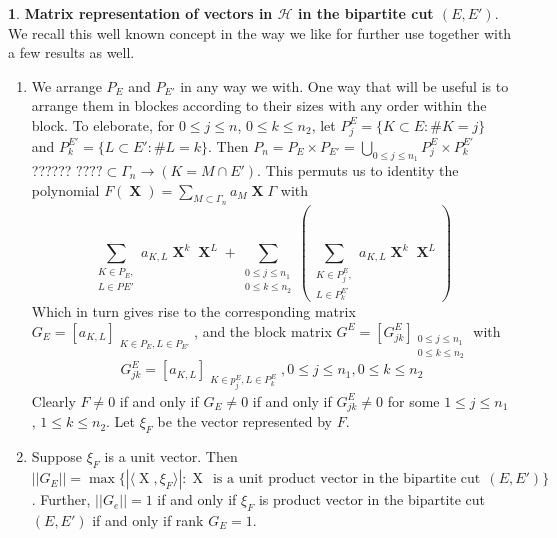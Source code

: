 \documentclass[a4paper,12pt]{article}
\DeclareMathOperator{\x}{\mathrm{X}}
\theoremstyle{definition}
\theoremstyle{underlinethm}
\theoremstyle{definition}
\newtheorem{subsubsec}{}[subsection]
\begin{document}
\begin{subsubsec}
\textbf{Matrix representation of vectors in $\mathcal{H}$ in the bipartite cut $(E, E')$}. We recall this well known concept in the way we like for further use together with a few results as well.
\begin{enumerate}[label = (\alph*)]
\item We arrange $P_{E}$ and $P_{E'}$ in any way we with. One way that will be useful is to arrange them in blockes according to their sizes with any order within the block. To eleborate, for $0 \leq j \leq n$, $0 \leq k \leq n_{2}$, let $P_{j}^{E} = \{K \subset E : \# K =j\}$ and $P_{k}^{E'} = \{L \subset E' : \# L =k\}$. Then $P_{n}= P_{E} \times P_{E'}= \bigcup\limits_{0 \leq j \leq n_{1}} P_{j}^{E} \times P_{k}^{E'}$ ?????? $???? \subset \Gamma_{n} \rightarrow (K=M \cap E')$. This permuts us to identity the polynomial $F(\boldsymbol{\x}) = \sum\limits_{M \subset \Gamma_{n}} a_{M} \boldsymbol{\x} \Gamma$ with 
\begin{equation}
\sum_{\substack{K \in P_{E},\\ L \in P_{}E'}} a_{K, L} \boldsymbol{\x}^{k} \boldsymbol{\x}^{L} +  \sum_{\substack{0 \leq j \leq n_{1} \\0 \leq k \leq n_{2}}} \left(\sum_{\substack{K \in P_{j}^{E},\\ L \in P_{k}^{E'}}} a_{K, L} \boldsymbol{\x}^{k} \boldsymbol{\x}^{L} \right)\tag{4.18}\label{eq-4.18}
\end{equation}
Which in turn gives rise to the corresponding matrix $G_{E} = [a_{K, L}]_{\substack{K \in P_{E}, L \in P_{E'}}}$, and the block matrix $G^{E} =[G_{jk}^{E}]_{\substack{0 \leq j \leq n_{1}\\ 0 \leq k \leq n_{2}}}$ with 
\begin{equation}
G_{jk}^{E}= [a_{K, L}]_{\substack{K \in p_{j}^{E}, L \in P_{k}^{E}}}, 0 \leq j \leq n_{1}, 0 \leq k \leq n_{2}\tag{4.19}\label{eq-4.19}
\end{equation}
Clearly $F \neq 0$ if and only if $G_{E} \neq 0$ if and only if $G_{j k}^{E} \neq 0$ for some $1 \leq j \leq n_{1}$, $1 \leq k \leq n_{2}$. Let $\xi_{F}$ be the vector represented by $F$.

\item Suppose $\xi_{F}$ is a unit vector. Then\\ $||G_{E}|| = \max\{| \langle \x, \xi_{F} \rangle | : \x~~\text{is a unit product vector in the bipartite cut}~~(E, E')\}$. Further, $||G_{e}||=1$ if and only if $\xi_{F}$ is product vector in the bipartite cut $(E, E')$ if and only if rank $G_{E}=1$.


\end{enumerate}
\end{subsubsec}
\end{document}
